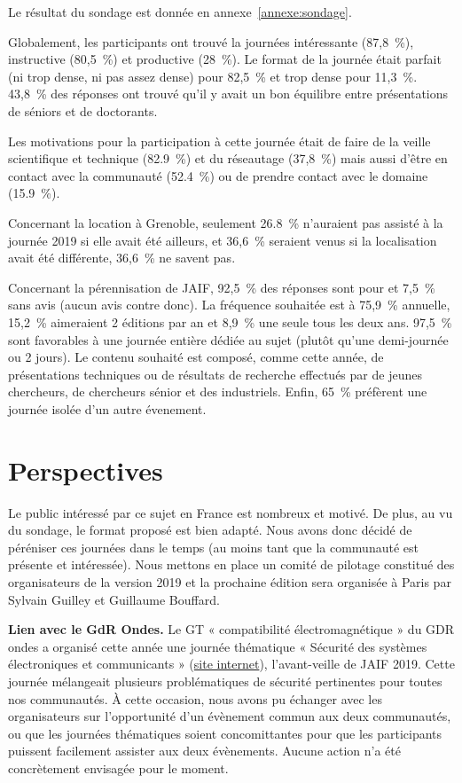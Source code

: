 \documentclass[a4paper,11pt]{article}
\begin{document}
Le résultat du sondage est donnée en annexe \ref{annexe:sondage}.

Globalement, les participants ont trouvé la journées intéressante (87,8 \%), instructive (80,5 \%) et productive (28 \%). Le format de la journée était parfait (ni trop dense, ni pas assez dense) pour 82,5 \% et trop dense pour 11,3 \%. 43,8 \% des réponses ont trouvé  qu'il y avait un bon équilibre entre présentations de séniors et de doctorants.

Les motivations pour la participation à cette journée était de faire de la veille scientifique et technique (82.9 \%) et du réseautage (37,8 \%) mais aussi d'être en contact avec la communauté (52.4 \%) ou de prendre contact avec le domaine (15.9 \%).

Concernant la location à Grenoble, seulement 26.8 \% n'auraient pas assisté à la journée 2019 si elle avait été ailleurs, et 36,6 \% seraient venus si la localisation avait été différente, 36,6 \% ne savent pas.

Concernant la pérennisation de JAIF, 92,5 \% des réponses sont pour et 7,5 \% sans avis (aucun avis contre donc). La fréquence souhaitée est à 75,9 \% annuelle, 15,2 \% aimeraient 2 éditions par an et 8,9 \% une seule tous les deux ans. 97,5 \% sont favorables à une journée entière dédiée au sujet (plutôt qu'une demi-journée ou 2 jours). Le contenu souhaité est composé, comme cette année, de présentations techniques ou de résultats de recherche effectués par de jeunes chercheurs, de chercheurs sénior et des industriels.
Enfin, 65 \% préfèrent une journée isolée d'un autre évenement.

\section{Perspectives}
\label{sec:org64c4da4}

Le public intéressé par ce sujet en France est nombreux et motivé. De
plus, au vu du sondage, le format proposé est bien adapté. Nous avons
donc décidé de péréniser ces journées dans le temps (au moins tant que
la communauté est présente et intéressée). Nous mettons en place un
comité de pilotage constitué des organisateurs de la version 2019 et
la prochaine édition sera organisée à Paris par Sylvain Guilley et Guillaume
Bouffard.

\textbf{Lien avec le GdR Ondes.} Le GT « compatibilité électromagnétique » du
GDR ondes a organisé cette année une journée thématique « Sécurité des
systèmes électroniques et communicants » (\href{http://gdr-ondes.cnrs.fr/2019/02/14/journee-thematique-securite-des-systemes-electroniques-et-communicants-21-mai-2019-paris-jussieu}{site internet}),
l'avant-veille de JAIF 2019.  Cette journée mélangeait plusieurs
problématiques de sécurité pertinentes pour toutes nos communautés.  À
cette occasion, nous avons pu échanger avec les organisateurs sur
l'opportunité d'un évènement commun aux deux communautés, ou que les
journées thématiques soient concomittantes pour que les participants
puissent facilement assister aux deux évènements.  Aucune action n'a
été concrètement envisagée pour le moment.
\end{document}
